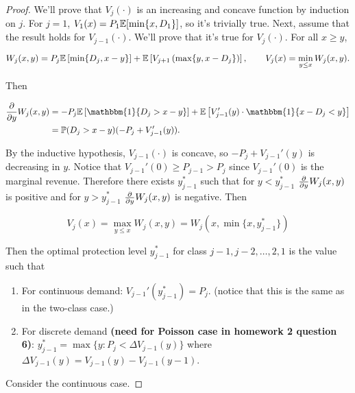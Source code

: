 \begin{proof}

We'll prove that \(V_j(\cdot)\) is an increasing and concave function by induction on \(j\). For \(j=1\), \(V_1(x) = P_1 \mathbb{E}[ \min\{x, D_1\}]\), so it's trivially true. Next, assume that the result holds for \(V_{j-1}(\cdot)\). We'll prove that it's true for \(V_j(\cdot)\). For all \(x \geq y\),

\[
W_j(x, y) = P_j \mathbb{E} \left[\min\{D_j, x - y \} \right]  + \mathbb{E} \left[ V_{j+1} \left( \max\{ y, x - D_j \}\right)  \right], \qquad V_j(x) = \min_{y \leq x} W_j(x,y).
\]

Then

\begin{align*}
\pderiv{}{y} W_j(x,y) & = - P_j \E \left[ \mathbbm{1}\{D_j > x - y\} \right] + \E \left[ V_{j-1}'(y) \cdot \mathbbm{1}\{x - D_j < y \} \right]
\\ & = \mathbb{P}(D_j > x-y) (- P_j + V_{j-1}'(y)). 
\end{align*}

By the inductive hypothesis, \(V_{j-1}(\cdot)\) is concave, so \(- P_j + V_{j-1}'(y)\) is decreasing in \(y\). Notice that \(V_{j-1}'(0) \geq P_{j-1} > P_j\) since \(V_{j-1}'(0)\) is the marginal revenue. Therefore there exists \(y_{j-1}^*\) such that for \(y < y_{j-1}^*\) \(\frac{\partial }{\partial y} W_j(x,y) \) is positive and for \(y > y_{j-1}^*\) \(\frac{\partial }{\partial y} W_j(x,y) \) is negative. Then

\[
V_j(x) = \max_{y \leq x} W_j(x,y) = W_j(x, \min\{x, y_{j-1}^*\}) 
\]

Then the optimal protection level \(y_{j-1}^*\) for class \(j-1, j-2, \ldots, 2, 1\) is the value such that 

\begin{enumerate}

\item For continuous demand: \(V_{j-1}' (y_{j-1}^*) = P_j\). (notice that this is the same as in the two-class case.)

\item For discrete demand \textbf{(need for Poisson case in homework 2 question 6)}: \(y_{j-1}^* = \max\{y: P_j < \Delta V_{j-1}(y)\}\) where \(\Delta V_{j-1}(y) = V_{j-1}(y) - V_{j-1}(y-1)\).

\end{enumerate}

Consider the continuous case.


\end{proof}

